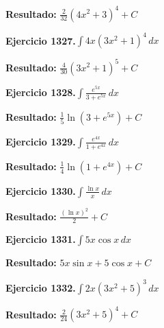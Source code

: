 \documentclass[10pt,a4paper]{article}
\begin{document}
\begin{solbox}
\textbf{Resultado:} \(\displaystyle \frac{2}{32}(4x^2+3)^{4} + C\)
\end{solbox}

\newpage
\begin{ejbox}
\textbf{Ejercicio 1327.}\quad $\int 4x(3x^2 + 1)^{4}\,dx$
\end{ejbox}

\begin{solbox}
\textbf{Resultado:} \(\displaystyle \frac{4}{30}(3x^2+1)^{5} + C\)
\end{solbox}

\begin{ejbox}
\textbf{Ejercicio 1328.}\quad $\int \frac{e^{5x}}{3+e^{5x}}\,dx$
\end{ejbox}

\begin{solbox}
\textbf{Resultado:} \(\displaystyle \frac{1}{5}\ln(3+e^{5x}) + C\)
\end{solbox}

\begin{ejbox}
\textbf{Ejercicio 1329.}\quad $\int \frac{e^{4x}}{1+e^{4x}}\,dx$
\end{ejbox}

\begin{solbox}
\textbf{Resultado:} \(\displaystyle \frac{1}{4}\ln(1+e^{4x}) + C\)
\end{solbox}

\newpage
\begin{ejbox}
\textbf{Ejercicio 1330.}\quad $\int \frac{\ln x}{x}\,dx$
\end{ejbox}

\begin{solbox}
\textbf{Resultado:} \(\displaystyle \frac{(\ln x)^2}{2} + C\)
\end{solbox}

\begin{ejbox}
\textbf{Ejercicio 1331.}\quad $\int 5x \cos x\,dx$
\end{ejbox}

\begin{solbox}
\textbf{Resultado:} \(\displaystyle 5x\sin x + 5\cos x + C\)
\end{solbox}

\begin{ejbox}
\textbf{Ejercicio 1332.}\quad $\int 2x(3x^2 + 5)^{3}\,dx$
\end{ejbox}

\begin{solbox}
\textbf{Resultado:} \(\displaystyle \frac{2}{24}(3x^2+5)^{4} + C\)
\end{solbox}
\end{document}
